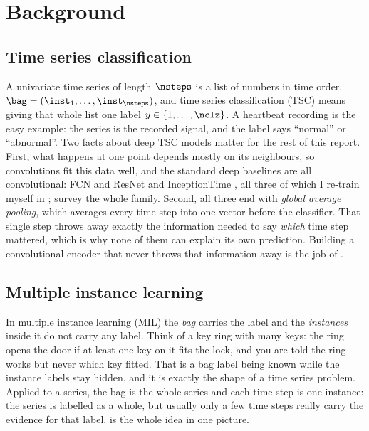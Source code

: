 %

\section{Background}
\label{sec:background}

\subsection{Time series classification}
\label{sec:bg:tsc}

A univariate time series of length $\nsteps$ is a list of numbers in time order,
$\bag = (\inst_1, \dots, \inst_{\nsteps})$, and time series classification (TSC) means giving that
whole list one label $y \in \{1, \dots, \nclz\}$. A heartbeat recording is the easy example: the
series is the recorded signal, and the label says ``normal'' or ``abnormal''. Two facts about deep
TSC models matter for the rest of this report. First, what happens at one point depends mostly on
its neighbours, so convolutions fit this data well, and the standard deep baselines are all
convolutional: FCN and ResNet \citep{wang2017fcn} and InceptionTime \citep{fawaz2020inceptiontime},
all three of which I re-train myself in ; \citet{fawaz2019review} survey
the whole family. Second, all three end with \emph{global average pooling}, which averages every
time step into one vector before the classifier. That single step throws away exactly the
information needed to say \emph{which} time step mattered, which is why none of them can explain its
own prediction. Building a convolutional encoder that never throws that information away is the job
of .

\subsection{Multiple instance learning}
\label{sec:bg:mil}

In multiple instance learning (MIL) \citep{dietterich1997mil} the \emph{bag} carries the label and
the \emph{instances} inside it do not carry any label. Think of a key ring with many keys: the ring opens the door if
at least one key on it fits the lock, and you are told the ring works but never which key fitted.
That is a bag label being known while the instance labels stay hidden, and it is exactly the shape
of a time series problem. Applied to a series, the bag is the whole series and each time step is one
instance: the series is labelled as a whole, but usually only a few time steps really carry the
evidence for that label.  is the whole idea in one picture.

